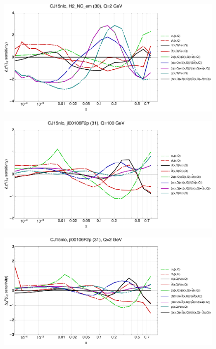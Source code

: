 \documentclass[10pt,aps,prd,floatfix,titlepage]{revtex4}
\begin{document}
\begin{figure}
\includegraphics[width=\textwidth,height=0.44\textheight,keepaspectratio]{2/30_CJ15nlo_q2_Sf_2.pdf}
\caption{}
\end{figure}
\clearpage
\begin{figure}
\includegraphics[width=\textwidth,height=0.44\textheight,keepaspectratio]{2/31_CJ15nlo_q100_Sf_2.pdf}
\caption{}
\end{figure}
\begin{figure}
\includegraphics[width=\textwidth,height=0.44\textheight,keepaspectratio]{2/31_CJ15nlo_q2_Sf_2.pdf}
\caption{}
\end{figure}
\end{document}
